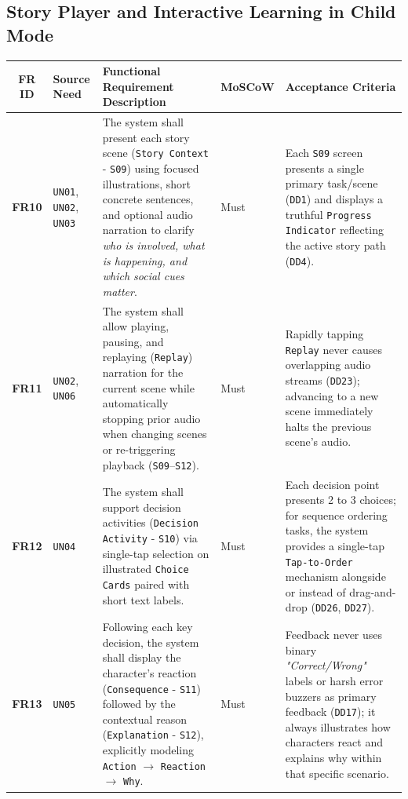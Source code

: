 \subsection{Story Player and Interactive Learning in Child Mode}


\begin{footnotesize}
\noindent\begin{xltabular}{\textwidth}{|c|p{2.2cm}|X|p{2.0cm}|p{2.4cm}|}
\hline
\textbf{FR ID} & \textbf{Source Need} & \textbf{Functional Requirement Description} & \textbf{MoSCoW} & \textbf{Acceptance Criteria} \\ \hline
\endhead
\textbf{FR10} & \texttt{UN01}, \texttt{UN02}, \texttt{UN03} & The system shall present each story scene (\texttt{Story Context} - \texttt{S09}) using focused illustrations, short concrete sentences, and optional audio narration to clarify \textit{who is involved, what is happening, and which social cues matter}. & Must & Each \texttt{S09} screen presents a single primary task/scene (\texttt{DD1}) and displays a truthful \texttt{Progress Indicator} reflecting the active story path (\texttt{DD4}). \\ \hline
\textbf{FR11} & \texttt{UN02}, \texttt{UN06} & The system shall allow playing, pausing, and replaying (\texttt{Replay}) narration for the current scene while automatically stopping prior audio when changing scenes or re-triggering playback (\texttt{S09}–\texttt{S12}). & Must & Rapidly tapping \texttt{Replay} never causes overlapping audio streams (\texttt{DD23}); advancing to a new scene immediately halts the previous scene's audio. \\ \hline
\textbf{FR12} & \texttt{UN04} & The system shall support decision activities (\texttt{Decision Activity} - \texttt{S10}) via single-tap selection on illustrated \texttt{Choice Cards} paired with short text labels. & Must & Each decision point presents 2 to 3 choices; for sequence ordering tasks, the system provides a single-tap \texttt{Tap-to-Order} mechanism alongside or instead of drag-and-drop (\texttt{DD26}, \texttt{DD27}). \\ \hline
\textbf{FR13} & \texttt{UN05} & Following each key decision, the system shall display the character's reaction (\texttt{Consequence} - \texttt{S11}) followed by the contextual reason (\texttt{Explanation} - \texttt{S12}), explicitly modeling \texttt{Action} $\rightarrow$ \texttt{Reaction} $\rightarrow$ \texttt{Why}. & Must & Feedback never uses binary \textit{"Correct/Wrong"} labels or harsh error buzzers as primary feedback (\texttt{DD17}); it always illustrates how characters react and explains why within that specific scenario. \\ \hline

\end{xltabular}
\end{footnotesize}
